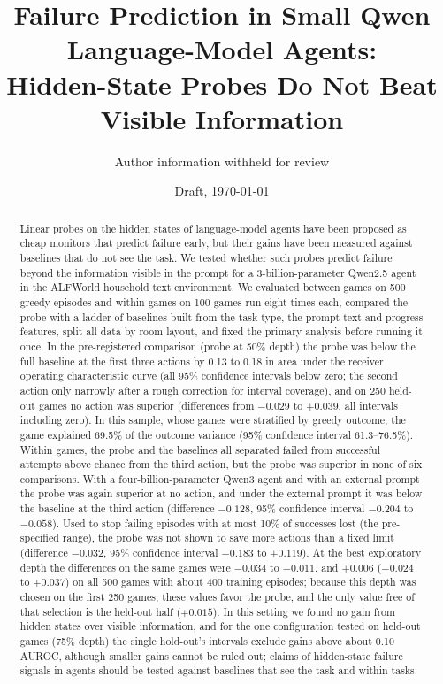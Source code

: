 \documentclass[11pt]{article}
\title{Failure Prediction in Small Qwen Language-Model Agents:\\Hidden-State Probes Do Not Beat Visible Information}
\author{Author information withheld for review}
\date{Draft, \today}
\begin{document}
\maketitle

\begin{abstract}
Linear probes on the hidden states of language-model agents have been proposed as cheap monitors that predict failure early, but their gains have been measured against baselines that do not see the task.
We tested whether such probes predict failure beyond the information visible in the prompt for a 3-billion-parameter Qwen2.5 agent in the ALFWorld household text environment.
We evaluated between games on 500 greedy episodes and within games on 100 games run eight times each, compared the probe with a ladder of baselines built from the task type, the prompt text and progress features,
split all data by room layout, and fixed the primary analysis before running it once.
In the pre-registered comparison (probe at 50\% depth) the probe was below the full baseline at the first three actions by 0.13 to 0.18 in area under the receiver operating characteristic curve (all 95\% confidence intervals below zero; the second action only narrowly after a rough correction for interval coverage),
and on 250 held-out games no action was superior (differences from $-0.029$ to $+0.039$, all intervals including zero).
In this sample, whose games were stratified by greedy outcome, the game explained 69.5\% of the outcome variance (95\% confidence interval 61.3--76.5\%). Within games, the probe and the baselines all separated failed from successful attempts above chance from the third action,
but the probe was superior in none of six comparisons. With a four-billion-parameter Qwen3 agent and with an external prompt the probe was again superior at no action, and under the external prompt it was below the baseline at the third action (difference $-0.128$, 95\% confidence interval $-0.204$ to $-0.058$).
Used to stop failing episodes with at most 10\% of successes lost (the pre-specified range), the probe was not shown to save more actions than a fixed limit (difference $-0.032$, 95\% confidence interval $-0.183$ to $+0.119$).
At the best exploratory depth the differences on the same games were $-0.034$ to $-0.011$, and $+0.006$ ($-0.024$ to $+0.037$) on all 500 games with about 400 training episodes; because this depth was chosen on the first 250 games, these values favor the probe, and the only value free of that selection is the held-out half ($+0.015$). In this setting we found no gain from hidden states over visible information, and for the one configuration tested on held-out games (75\% depth) the single hold-out's intervals exclude gains above about 0.10 AUROC, although smaller gains cannot be ruled out; claims of hidden-state failure signals in agents should be tested against baselines that see the task and within tasks.
\end{abstract}
\end{document}
